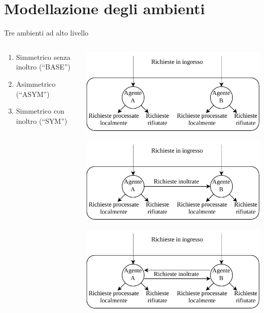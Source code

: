\documentclass[]{beamer}
\begin{document}
\section{Modellazione degli ambienti}

\begin{frame}{Tre ambienti ad alto livello}
    \begin{columns}
        \begin{column}{.6\textwidth}
            \begin{enumerate}
                \vspace{.5cm}
                \item Simmetrico senza inoltro (``BASE'')
                \vspace{2.2cm}
                
                \item Asimmetrico (``ASYM'')
                \vspace{2.2cm}
                
                \item Simmetrico con inoltro (``SYM'')
            \end{enumerate}
        \end{column}
        \hspace{-1.7cm}
        \begin{column}{.7\textwidth}
            \centering
            \includegraphics[width=.7\textwidth]{assets/4/1_sym_no_fw.pdf}
        
            \includegraphics[width=.7\textwidth]{assets/4/2_asym.pdf}
        
            \includegraphics[width=.7\textwidth]{assets/4/3_sym_fw.pdf}
        \end{column}
    \end{columns}
\end{frame}
\end{document}
